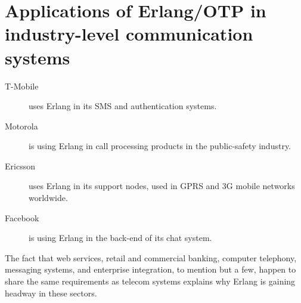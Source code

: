 \section{Applications of Erlang/OTP in industry-level communication systems}
\begin{description}
\item[T-Mobile] uses Erlang in its SMS and authentication systems.
\item[Motorola] is using Erlang in call processing products in the public-safety industry.
\item[Ericsson] uses Erlang in its support nodes, used in GPRS and 3G mobile networks worldwide.
\item[Facebook] is using Erlang in the back-end of its chat system.
\end{description}

The fact that web services, retail and commercial banking, computer telephony, messaging systems, and enterprise integration, to mention but a few, happen to share the same requirements as telecom systems explains why Erlang is gaining headway in these sectors.